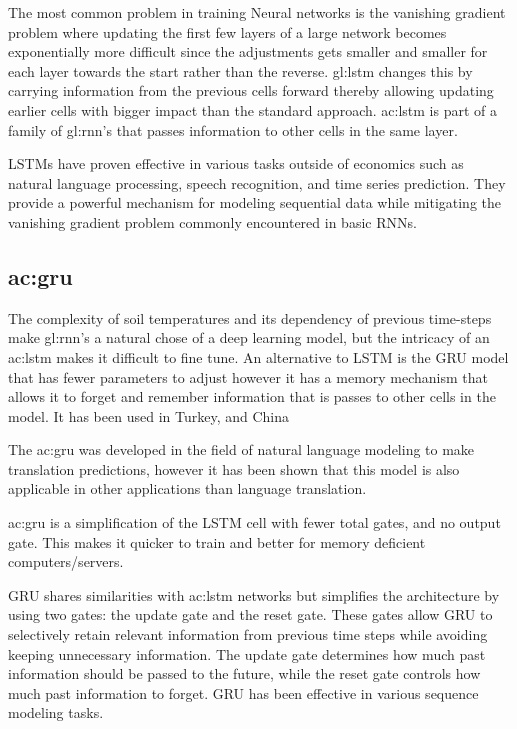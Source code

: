 The most common problem in training Neural networks is the vanishing gradient problem where updating the first few layers of a large network becomes exponentially more difficult since the adjustments gets smaller and smaller for each layer towards the start rather than the reverse. \gls{gl:lstm} changes this by carrying information from the previous cells forward thereby allowing updating earlier cells with bigger impact than the standard approach\cite{hochreiter_long_1997}. \acrshort{ac:lstm} is part of a family of \gls{gl:rnn}'s that passes information to other cells in the same layer.

LSTMs have proven effective in various tasks outside of economics such as natural language processing, speech recognition, and time series prediction. They provide a powerful mechanism for modeling sequential data while mitigating the vanishing gradient problem commonly encountered in basic RNNs.


\subsection{\acrfull{ac:gru}}

The complexity of soil temperatures and its dependency of previous time-steps make \gls{gl:rnn}'s a natural chose of a deep learning model, but the intricacy of an \acrshort{ac:lstm} makes it difficult to fine tune. An alternative to LSTM is the GRU model\cite{cho_learning_2014} that has fewer parameters to adjust however it has a memory mechanism that allows it to forget and remember information that is passes to other cells in the model. It has been used in Turkey\cite{uluocak_daily_2024}, and China\cite{li_forecasting_2024}

The \acrfull{ac:gru}\cite{cho_learning_2014} was developed in the field of natural language modeling to make translation predictions, however it has been shown that this model is also applicable in other applications than language translation. 

\acrshort{ac:gru} is a simplification of the LSTM cell with fewer total gates, and no output gate. This makes it quicker to train and better for memory deficient computers/servers.

GRU shares similarities with \acrshort{ac:lstm} networks but simplifies the architecture by using two gates: the update gate and the reset gate. These gates allow GRU to selectively retain relevant information from previous time steps while avoiding keeping unnecessary information. The update gate determines how much past information should be passed to the future, while the reset gate controls how much past information to forget. GRU has been effective in various sequence modeling tasks.
 
